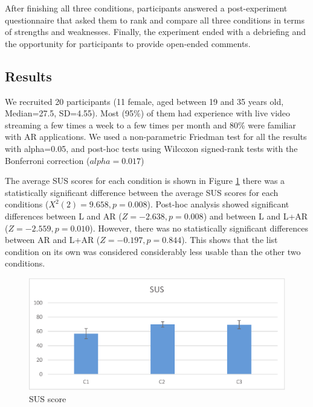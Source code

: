 
After finishing all three conditions, participants answered a post-experiment questionnaire that asked them to rank and compare all three conditions in terms of strengths and weaknesses. Finally, the experiment ended with a debriefing and the opportunity for participants to provide open-ended comments.



\subsection{Results}

We recruited 20 participants (11 female, aged between 19 and 35 years old, Median=27.5, SD=4.55). Most (95\%) of them had experience with live video streaming a few times a week to a few times per month and 80\% were familiar with AR applications. We used a non-parametric Friedman test for all the results with alpha=0.05, and post-hoc tests using Wilcoxon signed-rank tests with the Bonferroni correction ($alpha=0.017$)

The average SUS scores for each condition is shown in Figure \ref{fig:mgia16:questions_sus} there was a statistically significant difference between the average SUS scores for each conditions ($X^2(2)=9.658, p=0.008$). Post-hoc analysis showed significant differences between L and AR ($Z=-2.638, p=0.008$) and between L and L+AR ($Z=-2.559, p=0.010$). However, there was no statistically significant differences between AR and L+AR ($Z=-0.197, p=0.844$). This shows that the list condition on its own was considered considerably less usable than the other two conditions.


\begin{figure}[ht]
  \centering
  \includegraphics[width=.8\linewidth]{images/mgia16/sus.eps}
  \caption{SUS score}
  \label{fig:mgia16:questions_sus}
\end{figure}

